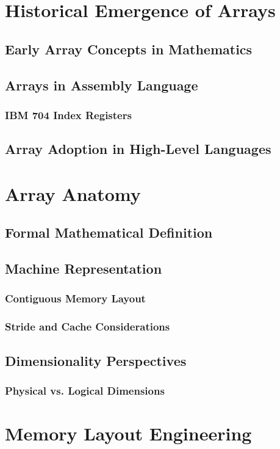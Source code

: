 \documentclass[12pt, oneside]{book}
\begin{document}
	 \chapter{Historical Emergence of Arrays}
	 \section{Early Array Concepts in Mathematics}
	 \section{Arrays in Assembly Language}
	 \subsection{IBM 704 Index Registers}
	 \section{Array Adoption in High-Level Languages}
	 
	 \chapter{Array Anatomy}
	 \section{Formal Mathematical Definition}
	 \section{Machine Representation}
	 \subsection{Contiguous Memory Layout}
	 \subsection{Stride and Cache Considerations}
	 \section{Dimensionality Perspectives}
	 \subsection{Physical vs. Logical Dimensions}
	 
	 \chapter{Memory Layout Engineering}
\end{document}
